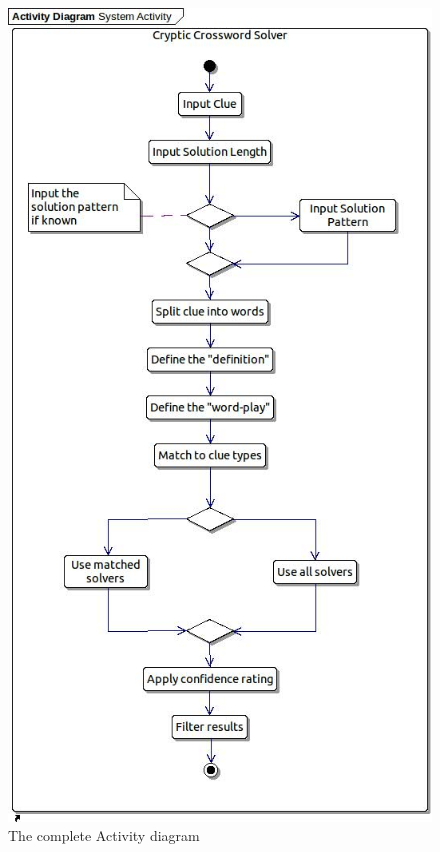 \begin{figure}[H]
  \centering
  \includegraphics[scale=0.55]{activity/system_activity.jpg}
  \caption{The complete Activity diagram}
  \label{fig:system_activity}
\end{figure}


